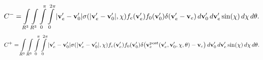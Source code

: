 \documentclass{article}
\newcommand{\myint}{\int\limits}
\newcommand{\diff}[1]{\, d#1}
\newcommand{\vect}[1]{\mathbf{#1}}
\newcommand{\of}[1]{\mleft( #1 \mright)}
\begin{document}
\begin{align*}
C^- = \myint_{R^3} \myint_{R^3} \myint_{0}^{\pi} \myint_{0}^{2\pi} 
|\vect{v}_e^\prime-\vect{v}_0^\prime| \sigma\of{|\vect{v}_e^\prime-\vect{v}_0^\prime|, \chi}
f_e\of{\vect{v}_e^\prime} f_0\of{\vect{v}_0^\prime} 
\delta\of{\vect{v}_e^\prime - \vect{v}_e} 
\diff{\vect{v}_0^\prime} \diff{\vect{v}_e^\prime} \sin\of{\chi} \diff{\chi} \diff{\theta}.
\end{align*}
\begin{align*}
C^+ = \myint_{R^3} \myint_{R^3} \myint_{0}^{\pi} \myint_{0}^{2\pi} 
|\vect{v}_e^\prime-\vect{v}_0^\prime| \sigma\of{|\vect{v}_e^\prime-\vect{v}_0^\prime|, \chi}
f_e\of{\vect{v}_e^\prime} f_0\of{\vect{v}_0^\prime} 
\delta\of{\vect{v}_e^\text{post}\of{\vect{v}_e^\prime, \vect{v}_0^\prime, \chi, \theta} - \vect{v}_e} 
\diff{\vect{v}_0^\prime} \diff{\vect{v}_e^\prime} \sin\of{\chi} \diff{\chi} \diff{\theta}.
\end{align*}

\clearpage
\end{document}
